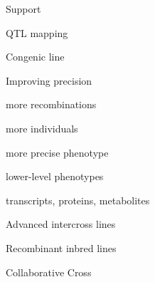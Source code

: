 \documentclass[12pt,t]{beamer}
\begin{document}
\begin{frame}{}

\vspace*{16.7mm}

\centerline{\Large Support}

\end{frame}



\begin{frame}[c]{QTL mapping}

\vspace{5mm}
\end{frame}



\begin{frame}[c]{Congenic line}


\end{frame}



\begin{frame}[c]{Improving precision}

  \vspace{-20mm}

  \bbi
\item more recombinations
\item more individuals
\item more precise phenotype
\item lower-level phenotypes
\bi
\item transcripts, proteins, metabolites
  \ei
  \ei

\end{frame}



\begin{frame}[c]{Advanced intercross lines}


\end{frame}


\begin{frame}[c]{Recombinant inbred lines}


\end{frame}


\begin{frame}[c]{Collaborative Cross}


\end{frame}
\end{document}
